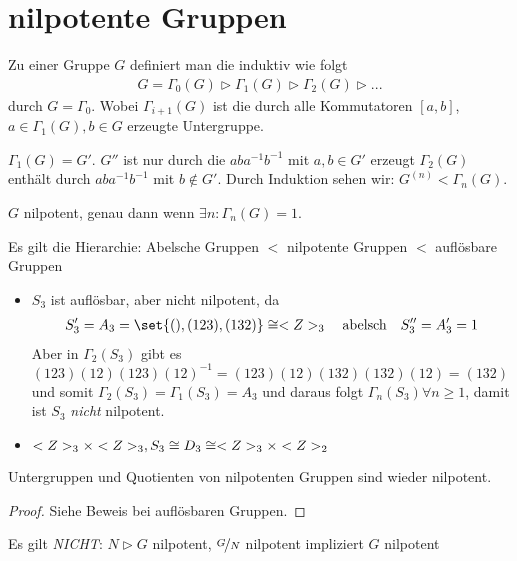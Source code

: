 \section{nilpotente Gruppen }
\begin{definition}
	Zu einer Gruppe $G$ definiert man die  induktiv wie folgt
	\begin{align*}
		G = \Gamma_0(G) \rhd \Gamma_1(G) \rhd\Gamma_2(G)\rhd ...
	\end{align*}
	durch $G = \Gamma_0$. Wobei $\Gamma_{i+1}(G)$ ist die durch alle Kommutatoren $[a,b]$, $a \in \Gamma_1(G), b \in G$ erzeugte Untergruppe.
\end{definition}
\begin{*remark}
	$\Gamma_1(G) = G'$. $G''$ ist nur durch die $aba^{-1}b^{-1}$ mit $a,b\in G'$ erzeugt $\Gamma_2(G)$ enthält durch $aba^{-1}b^{-1}$ mit $b \notin G'$. Durch Induktion sehen wir: $G^{(n)} < \Gamma_n(G)$.
\end{*remark}
\begin{definition}
	$G$ nilpotent, genau dann wenn $\exists n\colon\Gamma_n(G) = 1$.
\end{definition}
\begin{remark}
	Es gilt die Hierarchie: Abelsche Gruppen $<$ nilpotente Gruppen $<$ auflösbare Gruppen
\end{remark}
\begin{*example}
	\begin{itemize}
		\item $S_3$ ist auflösbar, aber nicht nilpotent, da
		\begin{align*}
			S_3' = A_3 = \set{(),(123),(132)} \cong \Z_3 \quad \text{abelsch}\quad S_3'' = A_3' = 1
		\end{align*}
		Aber in $\Gamma_2(S_3)$ gibt es $(123)(12)(123)(12)^{-1}= (123)(12)(132)(132)(12) = (132)$ und somit $\Gamma_2(S_3) = \Gamma_1(S_3) = A_3$ und daraus folgt $\Gamma_n(S_3)\forall n \ge 1$, damit ist $S_3$ \emph{nicht} nilpotent.
		\item $<Z>_3 \times <Z>_3,S_3 \cong D_3 \cong <Z>_3 \times <Z>_2$
	\end{itemize}
\end{*example}
\begin{proposition}
	Untergruppen und Quotienten von nilpotenten Gruppen sind wieder nilpotent.
\end{proposition}
\begin{proof}
	Siehe Beweis bei auflösbaren Gruppen.
\end{proof}
\begin{*remark}
	Es gilt \emph{NICHT}: $N \rhd G$ nilpotent, $\lnkset{G}{N}$ nilpotent impliziert $G$ nilpotent
\end{*remark}
